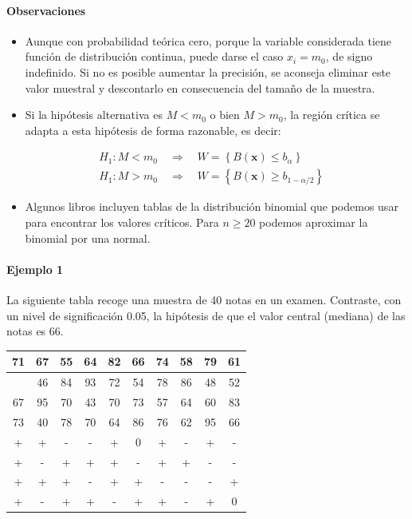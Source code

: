 \documentclass[
]{article}
\providecommand{\tightlist}{%
  \setlength{\itemsep}{0pt}\setlength{\parskip}{0pt}}
\begin{document}
\paragraph{Observaciones}\label{observaciones-2}

\begin{itemize}
\tightlist
\item
  Aunque con probabilidad teórica cero, porque la variable considerada tiene función de distribución continua, puede darse el caso \(x_{i}=m_{0}\), de signo indefinido. Si no es posible aumentar la precisión, se aconseja eliminar este valor muestral y descontarlo en consecuencia del tamaño de la muestra.
\item
  Si la hipótesis alternativa es \(M<m_{0}\) o bien \(M>m_{0}\), la región crítica se adapta a esta hipótesis de forma razonable, es decir:
\end{itemize}

\[
\begin{aligned}
& H_{1}: M<m_{0} \quad \Rightarrow \quad W=\left\{B(\mathbf{x}) \leq b_{\alpha}\right\} \\
& H_{1}: M>m_{0} \quad \Rightarrow \quad W=\left\{B(\mathbf{x}) \geq b_{1-\alpha / 2}\right\}
\end{aligned}
\]

\begin{itemize}
\tightlist
\item
  Algunos libros incluyen tablas de la distribución binomial que podemos usar para encontrar los valores críticos. Para \(n \geq 20\) podemos aproximar la binomial por una normal.
\end{itemize}

\paragraph{Ejemplo 1}\label{ejemplo-1-1}

La siguiente tabla recoge una muestra de 40 notas en un examen. Contraste, con un nivel de significación 0.05, la hipótesis de que el valor central (mediana) de las notas es 66.

\begin{longtable}[]{@{}cccccccccc@{}}
\toprule\noalign{}
71 & 67 & 55 & 64 & 82 & 66 & 74 & 58 & 79 & 61 \\
\midrule\noalign{}
\endhead
\bottomrule\noalign{}
\endlastfoot
78 & 46 & 84 & 93 & 72 & 54 & 78 & 86 & 48 & 52 \\
67 & 95 & 70 & 43 & 70 & 73 & 57 & 64 & 60 & 83 \\
73 & 40 & 78 & 70 & 64 & 86 & 76 & 62 & 95 & 66 \\
+ & + & - & - & + & 0 & + & - & + & - \\
+ & - & + & + & + & - & + & + & - & - \\
+ & + & + & - & + & + & - & - & - & + \\
+ & - & + & + & - & + & + & - & + & 0 \\
\end{longtable}
\end{document}
